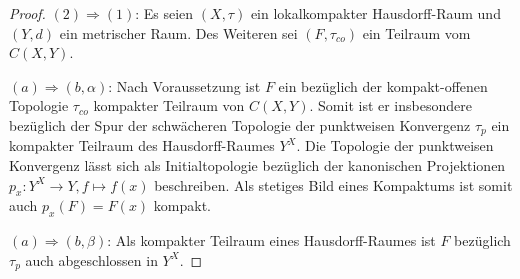 \begin{proof}
  $(2) \Rightarrow (1)$: Es seien $(X,\tau)$ ein lokalkompakter Hausdorff-Raum und $(Y,d)$ ein metrischer Raum.
  Des Weiteren sei $(F,\tau_{co})$ ein Teilraum vom $C(X,Y)$.

  $(a) \Rightarrow (b, \alpha)$: 
  Nach Voraussetzung ist $F$ ein bezüglich der kompakt-offenen Topologie $\tau_{co}$ kompakter Teilraum von $C(X,Y)$.
  Somit ist er insbesondere bezüglich der Spur der schwächeren Topologie der punktweisen Konvergenz $\tau_p$ ein kompakter Teilraum des Hausdorff-Raumes $Y^X$.
  Die Topologie der punktweisen Konvergenz lässt sich als Initialtopologie bezüglich der kanonischen Projektionen $p_x : Y^X \to Y, f \mapsto f(x)$ beschreiben.
  Als stetiges Bild eines Kompaktums ist somit auch $p_x(F) = F(x)$ kompakt.

  $(a) \Rightarrow (b, \beta)$:  
  Als kompakter Teilraum eines Hausdorff-Raumes ist $F$ bezüglich $\tau_p$ auch abgeschlossen in $Y^X$.


\end{proof}
